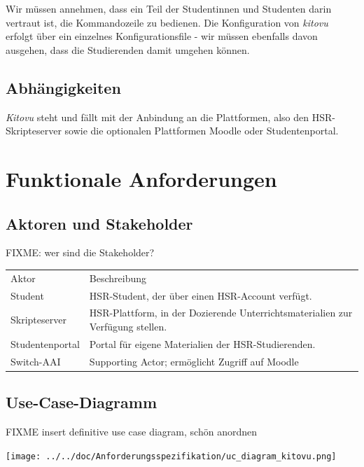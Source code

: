 \documentclass[a4paper]{article}
\let\oldsection\section
\renewcommand\section{\clearpage\oldsection}
\begin{document}
Wir müssen annehmen, dass ein Teil der Studentinnen und Studenten darin vertraut ist, die Kommandozeile zu bedienen. Die Konfiguration von \emph{kitovu} erfolgt über ein einzelnes Konfigurationsfile - wir müssen ebenfalls davon ausgehen, dass die Studierenden damit umgehen können.

\subsection{Abhängigkeiten}
\emph{Kitovu} steht und fällt mit der Anbindung an die Plattformen, also den HSR-Skripteserver sowie die optionalen Plattformen Moodle oder Studentenportal.

\pagebreak
\section{Funktionale Anforderungen}

\subsection{Aktoren und Stakeholder}
FIXME: wer sind die Stakeholder?

\begin{tabulary}{\linewidth}{lL}
	\toprule
	Aktor & Beschreibung\\
	Student & HSR-Student, der über einen HSR-Account verfügt.\\
	Skripteserver & HSR-Plattform, in der Dozierende Unterrichtsmaterialien zur Verfügung stellen.\\
	Studentenportal & Portal für eigene Materialien der HSR-Studierenden.\\
	Switch-AAI & Supporting Actor; ermöglicht Zugriff auf Moodle \\	
	
	\bottomrule
\end{tabulary}
\pagebreak

\subsection{Use-Case-Diagramm}

FIXME insert definitive use case diagram, schön anordnen

\texttt{[image: ../../doc/Anforderungsspezifikation/uc\_diagram\_kitovu.png]}
\end{document}
